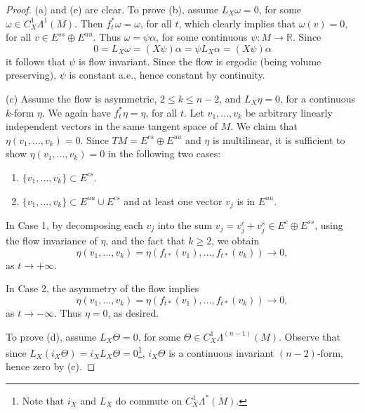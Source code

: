 \documentclass[11pt,letterpaper,reqno,abstract=true]{scrartcl}
\theoremstyle{plain}                              %
\theoremstyle{definition}                         %
\theoremstyle{remark}                             %
\newcommand{\R}{\mathbb{R}}                     %
\begin{document}
\begin{proof}
  (a) and (e) are clear. To prove (b), assume $L_X \omega = 0$, for
  some $\omega \in C^1_X \Lambda^1(M)$.  Then
  $f_t^\ast \omega = \omega$, for all $t$, which clearly implies that
  $\omega(v) = 0$, for all $v \in E^{ss} \oplus E^{uu}$. Thus
  $\omega = \psi \alpha$, for some continuous $\psi : M \to \R$. Since
    \begin{displaymath}
      0 = L_X \omega = (X\psi) \alpha = \psi L_X \alpha = (X \psi) \alpha
    \end{displaymath}
    it follows that $\psi$ is flow invariant. Since the flow is
    ergodic (being volume preserving), $\psi$ is constant a.e., hence
    constant by continuity.

    (c) Assume the flow is asymmetric, $2 \leq k \leq n-2$, and
    $L_X \eta = 0$, for a continuous $k$-form $\eta$. We again have
    $f_t^\ast \eta = \eta$, for all $t$. Let $v_1, \ldots, v_k$ be
    arbitrary linearly independent vectors in the same tangent space
    of $M$. We claim that $\eta(v_1,\ldots,v_k) = 0$. Since
    $TM = E^{cs} \oplus E^{uu}$ and $\eta$ is multilinear, it is
    sufficient to show $\eta(v_1,\ldots,v_k) = 0$ in the following two
    cases:

  \begin{enumerate}
%
  \item[\textbf{Case 1}:] $\{ v_1, \ldots, v_k \} \subset E^{cs}$.
%
  \item[\textbf{Case 2}:]
    $\{ v_1, \ldots, v_k \} \subset E^{uu} \cup E^{cs}$ and at
    least one vector $v_j$ is in $E^{uu}$.
%
  \end{enumerate}

  \nopagebreak[4] In Case 1, by decomposing each $v_j$ into the sum
  $v_j = v_j^c + v_j^s \in E^c \oplus E^{ss}$, using the flow
  invariance of $\eta$, and the fact that $k \geq 2$, we obtain
%
    \begin{displaymath}
      \eta(v_1,\ldots,v_k) = \eta(f_{t \ast}(v_1), \ldots, f_{t
        \ast}(v_k)) \to 0,
    \end{displaymath}
%
    as $t \to +\infty$.

    In Case 2, the asymmetry of the flow implies 
%
    \begin{displaymath}
      \eta(v_1,\ldots,v_k) = \eta(f_{t \ast}(v_1), \ldots, f_{t
        \ast}(v_k)) \to 0,
    \end{displaymath}
%
    as $t \to -\infty$. Thus $\eta = 0$, as desired.

    To prove (d), assume $L_X \Theta = 0$, for some 
    $\Theta \in C^1_X \Lambda^{(n-1)}(M)$. Observe that since
    $L_X (i_X \Theta) = i_X L_X \Theta = 0$\footnote{Note that $i_X$
      and $L_X$ do commute on $C^1_X \Lambda^\ast(M)$.}, $i_X \Theta$
    is a continuous invariant $(n-2)$-form, hence zero by (c).


\end{proof}
\end{document}
